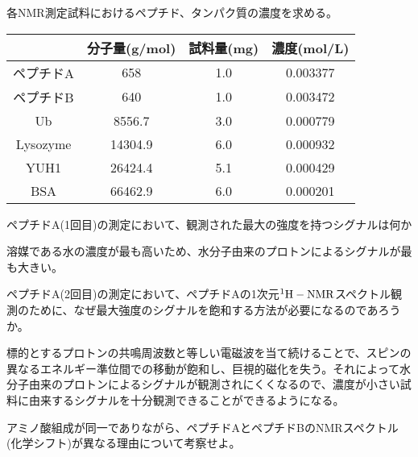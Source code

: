 \documentclass[a4paper,papersize,dvipdfmx]{jsarticle}
\begin{document}
\begin{tcolorbox}[colback=white,colbacktitle=black!10!white,coltitle=black,title={1}]
各NMR測定試料におけるペプチド、タンパク質の濃度を求める。
\end{tcolorbox}

\begin{table}[H]
\begin{center}
\begin{tabular}{|c|c|c|c|}
\hline
& 分子量(g/mol) & 試料量(mg) & 濃度(mol/L)        \\ \hline
ペプチドA      & 658     & 1.0       & 0.003377 \\ \hline
ペプチドB      & 640     & 1.0       & 0.003472 \\ \hline
Ub         & 8556.7  & 3.0       & 0.000779 \\ \hline
Lysozyme   & 14304.9 & 6.0       & 0.000932 \\ \hline
YUH1       & 26424.4 & 5.1       & 0.000429 \\ \hline
BSA        & 66462.9 & 6.0       & 0.000201 \\ \hline
\end{tabular}
\end{center}
\end{table}


\begin{tcolorbox}[colback=white,colbacktitle=black!10!white,coltitle=black,title={2}]
ペプチドA(1回目)の測定において、観測された最大の強度を持つシグナルは何か
\end{tcolorbox}

溶媒である水の濃度が最も高いため、水分子由来のプロトンによるシグナルが最も大きい。


\begin{tcolorbox}[colback=white,colbacktitle=black!10!white,coltitle=black,title={3}]
ペプチドA(2回目)の測定において、ペプチドAの1次元$\rm ^1H-NMR$スペクトル観測のために、なぜ最大強度のシグナルを飽和する方法が必要になるのであろうか。
\end{tcolorbox}

標的とするプロトンの共鳴周波数と等しい電磁波を当て続けることで、スピンの異なるエネルギー準位間での移動が飽和し、巨視的磁化を失う。それによって水分子由来のプロトンによるシグナルが観測されにくくなるので、濃度が小さい試料に由来するシグナルを十分観測できることができるようになる。


\begin{tcolorbox}[colback=white,colbacktitle=black!10!white,coltitle=black,title={4}]
アミノ酸組成が同一でありながら、ペプチドAとペプチドBのNMRスペクトル(化学シフト)が異なる理由について考察せよ。
\end{tcolorbox}
\end{document}
